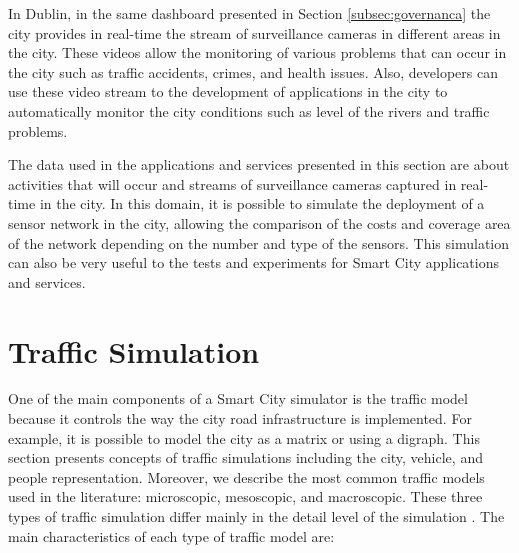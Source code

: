 In Dublin, in the same dashboard presented in Section \ref{subsec:governanca} the city provides in real-time the stream of surveillance cameras in different areas in the city. These videos allow the monitoring of various problems that can occur in the city such as traffic accidents, crimes, and health issues. Also, developers can use these video stream to the development of applications in the city to automatically monitor the city conditions such as level of the rivers and traffic problems.

The data used in the applications and services presented in this section are about activities that will occur and streams of surveillance cameras captured in real-time in the city. In this domain, it is possible to simulate the deployment of a sensor network in the city, allowing the comparison of the costs and coverage area of the network depending on the number and type of the sensors. This simulation can also be very useful to the tests and experiments for Smart City applications and services. 

\section{Traffic Simulation}
\label{sec:simulacaoTransito}

One of the main components of a Smart City simulator is the traffic model because it controls the way the city road infrastructure is implemented. For example, it is possible to model the city as a matrix or using a digraph. This section presents concepts of traffic simulations including the city, vehicle, and people representation. Moreover, we describe the most common traffic models used in the literature: microscopic, mesoscopic, and macroscopic. These three types of traffic simulation differ mainly in the detail level of the simulation \citep{barcelo2010fundamentals}. The main characteristics of each type of traffic model are:

